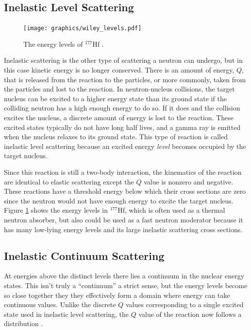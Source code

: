 \subsection{Inelastic Level Scattering}

\begin{figure}[h!]
  \centering
    \texttt{[image: graphics/wiley\_levels.pdf]}
     \caption{The energy levels of $^{177}$Hf \cite{krane}. \label{Elevels}}
\end{figure}

Inelastic scattering is the other type of scattering a neutron can undergo, but in this case kinetic energy is no longer conserved.  There is an amount of energy, $Q$, that is released from the reaction to the particles, or more commonly, taken from the particles and lost to the reaction.  In neutron-nucleus collisions, the target nucleus can be excited to a higher energy state than its ground state if the colliding neutron has a high enough energy to do so.  If it does and the collision excites the nucleus, a discrete amount of energy is lost to the reaction.  These excited states typically do not have long half lives, and a gamma ray is emitted when the nucleus relaxes to its ground state.  This type of reaction is called inelastic level scattering because an excited energy \emph{level} becomes occupied by the target nucleus.  

Since this reaction is still a two-body interaction, the kinematics of the reaction are identical to elastic scattering except the $Q$ value is nonzero and negative.  These reactions have a threshold energy below which their cross sections are zero since the neutron would not have enough energy to excite the target nucleus.   Figure \ref{Elevels} shows the energy levels in $^{177}$Hf, which is often used as a thermal neutron absorber, but also could be used as a fast neutron moderator because it has many low-lying energy levels and its large inelastic scattering cross sections.


\subsection{Inelastic Continuum Scattering}

At energies above the distinct levels there lies a continuum in the nuclear energy states.  This isn't truly a ``continuum'' a strict sense, but the energy levels become so close together they they effectively form a domain where energy can take continuous values.  Unlike the discrete $Q$ values corresponding to a single excited state used in inelastic level scattering, the $Q$ value of the reaction now follows a distribution \cite{krane}.  

